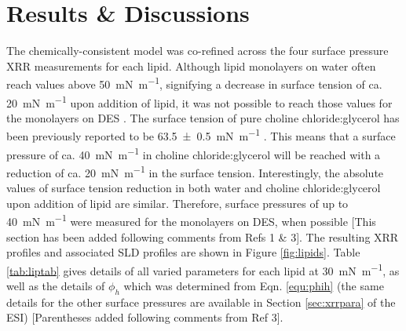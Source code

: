 \documentclass[amsmath,amssymb,twocolumn,superscriptaddress]{revtex4-1}
\begin{document}
\section{Results \& Discussions}
%
The chemically-consistent model was co-refined across the four surface pressure XRR measurements for each lipid.
Although lipid monolayers on water often reach values above \SI{50}{\milli\newton\per\meter}, signifying a decrease in surface tension of ca. \SI{20}{\milli\newton\per\meter} upon addition of lipid, it was not possible to reach those values for the monolayers on DES \cite{mohwald_phospholipid_1990}.
The surface tension of pure choline chloride:glycerol has been previously reported to be \SI{63.5\pm0.5}{\milli\newton\per\meter} \cite{sanchez-fernandez_micellization_2016}.
This means that a surface pressure of ca. \SI{40}{\milli\newton\per\meter} in choline chloride:glycerol will be reached with a reduction of ca. \SI{20}{\milli\newton\per\meter} in the surface tension.
Interestingly, the absolute values of surface tension reduction in both water and choline chloride:glycerol upon addition of lipid are similar.
Therefore, surface pressures of up to \SI{40}{\milli\newton\per\meter} were measured for the monolayers on DES, when possible [This section has been added following comments from Refs 1 \& 3].
The resulting XRR profiles and associated SLD profiles are shown in Figure \ref{fig:lipids}.
Table \ref{tab:liptab} gives details of all varied parameters for each lipid at \SI{30}{\milli\newton\per\meter}, as well as the details of $\phi_h$ which was determined from Eqn. \ref{equ:phih} (the same details for the other surface pressures are available in Section \ref{sec:xrrpara} of the ESI) [Parentheses added following comments from Ref 3].
%
\end{document}
